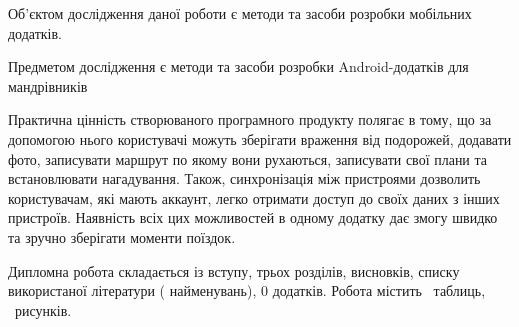 \documentclass[../main.tex]{subfiles}
\begin{document}
Об'єктом дослідження даної роботи є методи та засоби розробки мобільних додатків. 

Предметом дослідження є методи та засоби розробки Android-додатків для мандрівників

Практична цінність створюваного програмного продукту полягає в тому, що за допомогою нього користувачі можуть зберігати враження від подорожей, додавати фото, записувати маршрут по якому вони рухаються, записувати свої плани та встановлювати нагадування. Також, синхронізація між пристроями дозволить користувачам, які мають аккаунт, легко отримати доступ до своїх даних з інших пристроїв. Наявність всіх цих можливостей в одному додатку дає змогу швидко та зручно зберігати моменти поїздок.

Дипломна робота складається із вступу, трьох розділів, висновків, списку використаної літератури ( найменувань), 0 додатків. Робота містить \totaltables\ таблиць, \totalfigures\ рисунків. 
\end{document}
